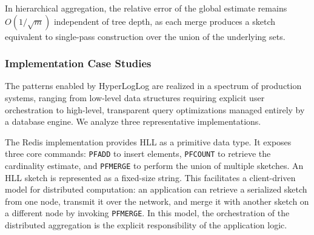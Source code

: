 \begin{remark}
    In hierarchical aggregation, the relative error of the global estimate remains $O(1/\sqrt{m})$ independent of tree depth, as each merge produces a sketch equivalent to single-pass construction over the union of the underlying sets.
\end{remark}


\subsubsection{Implementation Case Studies}

The patterns enabled by HyperLogLog are realized in a spectrum of production systems, ranging from low-level data structures requiring explicit user orchestration to high-level, transparent query optimizations managed entirely by a database engine. We analyze three representative implementations.

The Redis implementation \cite{redis-hll} provides HLL as a primitive data type. It exposes three core commands: \texttt{PFADD} to insert elements, \texttt{PFCOUNT} to retrieve the cardinality estimate, and \texttt{PFMERGE} to perform the union of multiple sketches. An HLL sketch is represented as a fixed-size string. This facilitates a client-driven model for distributed computation: an application can retrieve a serialized sketch from one node, transmit it over the network, and merge it with another sketch on a different node by invoking \texttt{PFMERGE}. In this model, the orchestration of the distributed aggregation is the explicit responsibility of the application logic.

